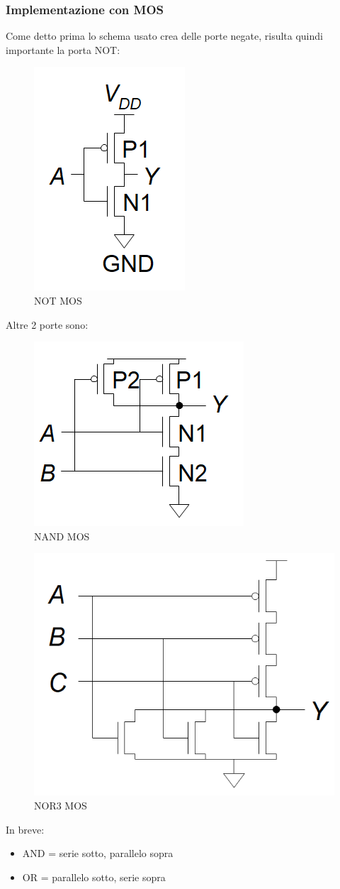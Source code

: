 \documentclass{article}
\begin{document}
\subsubsection{Implementazione con MOS}

Come detto prima lo schema usato crea delle porte negate, risulta quindi importante la porta NOT:

\begin{figure}[ht]
    \centering
    \includegraphics[width=0.25\linewidth]{NOT_MOS.png}
    \caption{NOT MOS}
    \label{fig:not_mos}
\end{figure}

Altre 2 porte sono:

\begin{figure}[ht]
    \centering
    \includegraphics[width=0.31\linewidth]{NAND_MOS.png}
    \caption{NAND MOS}
    \label{fig:nand_mos}
\end{figure}


\begin{figure}[ht]
    \centering
    \includegraphics[width=0.31\linewidth]{NOR3_MOS.png}
    \caption{NOR3 MOS}
    \label{fig:nor3_mos}
\end{figure}

In breve:
\begin{itemize}
    \item AND = serie sotto, parallelo sopra
    \item OR = parallelo sotto, serie sopra
\end{itemize}
\end{document}
